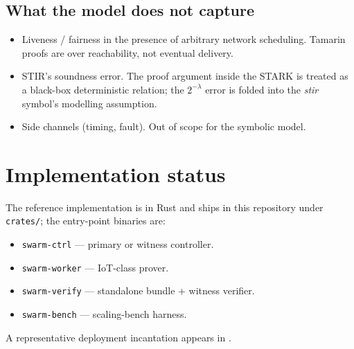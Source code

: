 \documentclass[11pt,a4paper]{article}
\theoremstyle{definition}
\theoremstyle{plain}
\begin{document}
\subsection{What the model does not capture}

\begin{itemize}[leftmargin=*]
  \item Liveness / fairness in the presence of arbitrary network
        scheduling.  Tamarin proofs are over reachability, not
        eventual delivery.
  \item STIR's soundness error.  The proof argument inside the
        STARK is treated as a black-box deterministic relation; the
        $2^{-\lambda}$ error is folded into the \emph{stir}
        symbol's modelling assumption.
  \item Side channels (timing, fault).  Out of scope for the symbolic
        model.
\end{itemize}

\section{Implementation status}

The reference implementation is in Rust and ships in this repository
under \texttt{crates/}; the entry-point binaries are:

\begin{itemize}[leftmargin=*]
  \item \texttt{swarm-ctrl} — primary or witness controller.
  \item \texttt{swarm-worker} — IoT-class prover.
  \item \texttt{swarm-verify} — standalone bundle + witness verifier.
  \item \texttt{swarm-bench} — scaling-bench harness.
\end{itemize}

A representative deployment incantation appears in
.
\end{document}
